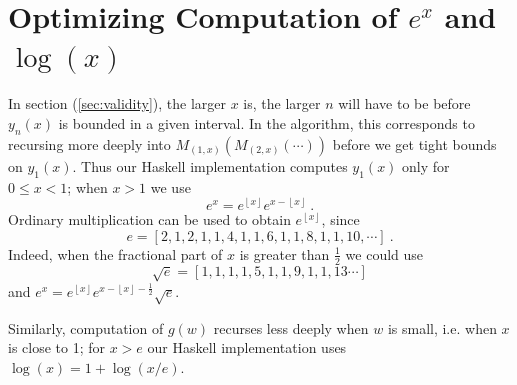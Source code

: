 \documentclass[11pt, oneside]{amsart}   	%
\renewcommand{\:}{\negthickspace:\negthickspace}
\begin{document}
\section{Optimizing Computation of $e^x$ and $\log(x)$}
In section (\ref{sec:validity}), the larger $x$ is, the larger $n$ will have to be before $y_n(x)$ is bounded in  a given interval. In the algorithm, this corresponds to recursing more deeply into $M_{(1,x)}( M_{(2,x)}( \cdots ) )$ before we get tight bounds on $y_1(x)$. Thus our Haskell implementation computes $y_1(x)$ only for $0 \leq x < 1$; when $x>1$ we use
\[
e^x = e^{\left\lfloor x \right\rfloor}e^{x - \left\lfloor x \right\rfloor} \ .
\]
Ordinary multiplication can be used to obtain $e^{\left\lfloor x \right\rfloor}$, since
\[
e = [2,1,2,1,1,4,1,1,6,1,1,8,1,1,10,\cdots] \ .
\]
Indeed, when the fractional part of $x$ is greater than $\frac{1}{2}$ we could use
\[
\sqrt{e} = [1,1,1,1,5,1,1,9,1,1,13\cdots]
\]
and $e^x = e^{\left\lfloor x \right\rfloor }e^{x - \left\lfloor x \right\rfloor- \frac{1}{2}}\sqrt{e}$.

Similarly, computation of $g(w)$ recurses less deeply when $w$ is small, i.e. when $x$ is close to 1; for $x>e$ our Haskell implementation uses $\log(x) = 1 + \log(x/e)$.




\end{document}
